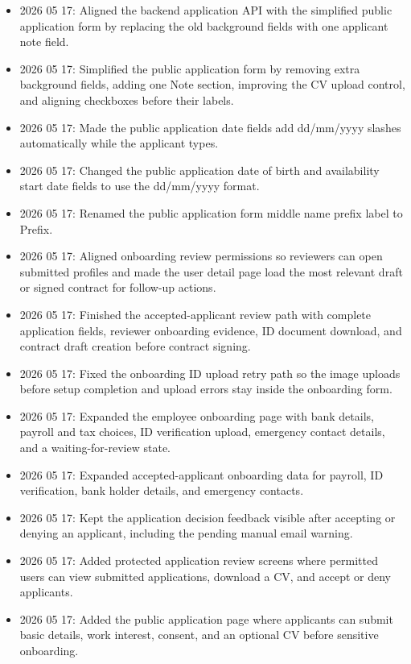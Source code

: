 \documentclass[11pt]{article}
\begin{document}
\begin{itemize}
    \item 2026 05 17: Aligned the backend application API with the simplified public application form by replacing the old background fields with one applicant note field.
    \item 2026 05 17: Simplified the public application form by removing extra background fields, adding one Note section, improving the CV upload control, and aligning checkboxes before their labels.
    \item 2026 05 17: Made the public application date fields add dd/mm/yyyy slashes automatically while the applicant types.
    \item 2026 05 17: Changed the public application date of birth and availability start date fields to use the dd/mm/yyyy format.
    \item 2026 05 17: Renamed the public application form middle name prefix label to Prefix.
    \item 2026 05 17: Aligned onboarding review permissions so reviewers can open submitted profiles and made the user detail page load the most relevant draft or signed contract for follow-up actions.
    \item 2026 05 17: Finished the accepted-applicant review path with complete application fields, reviewer onboarding evidence, ID document download, and contract draft creation before contract signing.
    \item 2026 05 17: Fixed the onboarding ID upload retry path so the image uploads before setup completion and upload errors stay inside the onboarding form.
    \item 2026 05 17: Expanded the employee onboarding page with bank details, payroll and tax choices, ID verification upload, emergency contact details, and a waiting-for-review state.
    \item 2026 05 17: Expanded accepted-applicant onboarding data for payroll, ID verification, bank holder details, and emergency contacts.
    \item 2026 05 17: Kept the application decision feedback visible after accepting or denying an applicant, including the pending manual email warning.
    \item 2026 05 17: Added protected application review screens where permitted users can view submitted applications, download a CV, and accept or deny applicants.
    \item 2026 05 17: Added the public application page where applicants can submit basic details, work interest, consent, and an optional CV before sensitive onboarding.

\end{itemize}
\end{document}
